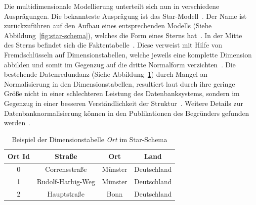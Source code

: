 \documentclass[
  language=german, %
  type=bachelor%
]{isthesis}
\begin{document}
\begin{content}
  \begin{figure}[caption={Dimensionslevelstruktur der Beispieldimension Zeit}, label={hierarchie-level-struktur}]
    \resizebox{100pt}{!}{}
  \end{figure}

	Die multidimensionale Modellierung unterteilt sich nun in verschiedene
	Ausprägungen.  Die bekannteste Ausprägung ist das Star-Modell~\cite[][S.
	2]{phipps2002automating}. Der Name ist zurückzuführen auf den Aufbau eines
	entsprechenden Modells (Siehe Abbildung~\ref{fig:star-schema}), welches die
	Form eines Sterns hat~\cite[][S.  44]{Kimball2013}. In der Mitte des Sterns
	befindet sich die Faktentabelle~\cite[][S. 67]{Kemper2010}. Diese verweist
	mit Hilfe von Fremdschlüsseln auf Dimensionstabellen, welche jeweils eine
	komplette Dimension abbilden und somit im Gegenzug auf die dritte Normalform
	verzichten~\cite[][S. 67 f.]{Kemper2010}. Die bestehende Datenredundanz
	(Siehe Abbildung~\ref{table:dimension-table}) durch Mangel an Normalisierung
	in den Dimensionstabellen, resultiert laut \textsc{\citeauthor{Kimball2013}}
	durch ihre geringe Größe nicht in einer schlechteren Leistung des
	Datenbanksystems, sondern im Gegenzug in einer besseren Verständlichkeit der
	Struktur~\cite[][S. 15]{Kimball2013}. Weitere Details zur
	Datenbanknormalisierung können in den Publikationen des
	Begründers
	\textsc{\citeauthor{codd1970relational}} gefunden
	werden~\citeyearpar{codd1970relational,codd1972further}.

  \begin{figure}[caption={Star-Schema Beispielmodell angelehnt an~\cite{Kemper2010} Abb. 2.30}, label={fig:star-schema}]
    \resizebox{0.5\linewidth}{!}{}
  \end{figure}

  \begin{table}[]
    \footnotesize
    \begin{tabular}{c c c c}
      Ort Id & Straße & Ort & Land \\
      \toprule
      0 & Corrensstraße & Münster & Deutschland \\
      1 & Rudolf-Harbig-Weg & Münster & Deutschland \\
      2 & Hauptstraße & Bonn & Deutschland \\
    \end{tabular}
    \caption{Beispiel der Dimensionstabelle \textit{Ort} im Star-Schema}\label{table:dimension-table}
  \end{table}


\end{content}
\end{document}
